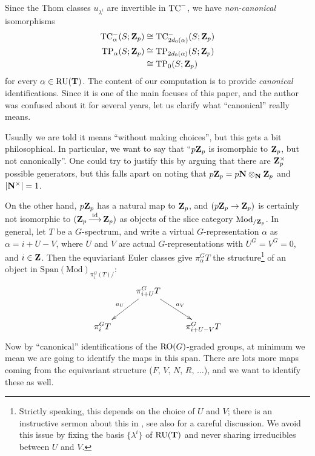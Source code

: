 \begin{notation}
  \label{not:canonical}
  Since the Thom classes $u_{\lambda^i}$ are invertible in $\mathrm{TC}^-$, we have \emph{non-canonical} isomorphisms
  \begin{align*}
    \mathrm{TC}^-_\alpha(S;\mathbf Z_p) &\cong \mathrm{TC}^-_{2 d_0(\alpha)}(S;\mathbf Z_p)\\
    \mathrm{TP}_\alpha(S;\mathbf Z_p) &\cong \mathrm{TP}_{2 d_0(\alpha)}(S;\mathbf Z_p)\\
                      &\cong \mathrm{TP}_0(S;\mathbf Z_p)
  \end{align*}
  for every $\alpha\in\operatorname{RU}(\mathbf T)$. The content of our computation is to provide \emph{canonical} identifications. Since it is one of the main focuses of this paper, and the author was confused about it for several years, let us clarify what ``canonical'' really means.

  Usually we are told it means ``without making choices'', but this gets a bit philosophical. In particular, we want to say that ``$p\mathbf Z_p$ is isomorphic to $\mathbf Z_p$, but not canonically''. One could try to justify this by arguing that there are $\mathbf Z_p^\times$ possible generators, but this falls apart on noting that $p\mathbf Z_p = p\mathbf N \otimes_\mathbf N \mathbf Z_p$ and $|\mathbf N^\times|=1$.

  On the other hand, $p\mathbf Z_p$ has a natural map to $\mathbf Z_p$, and $(p\mathbf Z_p \to \mathbf Z_p)$ is certainly not isomorphic to $(\mathbf Z_p \mathop{\longrightarrow}\limits^{\mathrm{id}} \mathbf Z_p)$ as objects of the slice category $\operatorname{Mod}_{/\mathbf Z_p}$. In general, let $T$ be a $G$-spectrum, and write a virtual $G$-representation $\alpha$ as $\alpha = i + U - V$, where $U$ and $V$ are actual $G$-representations with $U^G=V^G=0$, and $i\in\mathbf Z$. Then the equviariant Euler classes give $\pi_\alpha^G T$ the structure\footnote{Strictly speaking, this depends on the choice of $U$ and $V$; there is an instructive sermon about this in \cite[]{Adams}, see also \cite{DuggerCoherence,GradedTambara} for a careful discussion. We avoid this issue by fixing the basis $\{\lambda^i\}$ of $\operatorname{RU}(\mathbf T)$ and never sharing irreducibles between $U$ and $V$.} of an object in $\mathrm{Span}(\mathrm{Mod})_{\pi^G_i(T)/}$:
  \[ \xymatrix{
    & \ar[dl]_-{a_U} \pi^G_{i+U} T \ar[dr]^-{a_V}\\
    \pi_i^G T && \pi^G_{i+U-V}T
  } \]
  Now by ``canonical'' identifications of the $\operatorname{RO}(G)$-graded groups, at minimum we mean we are going to identify the maps in this span. There are lots more maps coming from the equivariant structure ($F,\,V,\,N,\,R,\,\dots$), and we want to identify these as well.


\end{notation}
